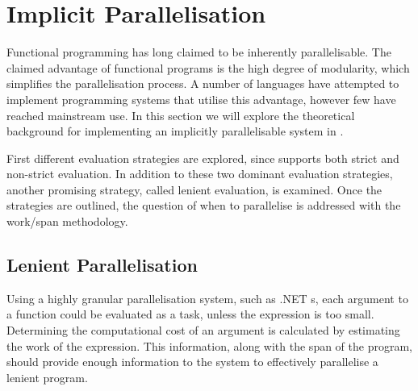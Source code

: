 \section{Implicit Parallelisation}\label{sec:implicit-para}
Functional programming has long claimed to be inherently parallelisable\cite{hudak1986functional, loidl1998granularity}. The claimed advantage of functional programs is the high degree of modularity, which simplifies the parallelisation process. A number of languages have attempted to implement programming systems that utilise this advantage, however few have reached mainstream use. In this section we will explore the theoretical background for implementing an implicitly parallelisable system in \fs.

First different evaluation strategies are explored, since \fs supports both strict and non-strict evaluation. In addition to these two dominant evaluation strategies, another promising strategy, called lenient evaluation, is examined. Once the strategies are outlined, the question of when to parallelise is addressed with the work/span methodology.




\subsection{Lenient Parallelisation}
Using a highly granular parallelisation system, such as .NET s, each argument to a function could be evaluated as a task, unless the expression is too small. Determining the computational cost of an argument is calculated by estimating the work of the expression. This information, along with the span of the program, should provide enough information to the system to effectively parallelise a lenient program.